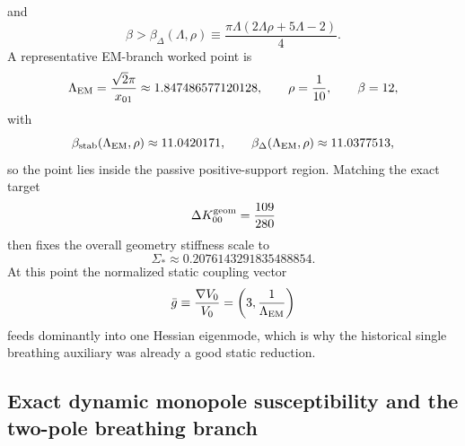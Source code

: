 \documentclass[11pt]{article}
\begin{document}
and
\begin{equation}
\beta>\beta_{\Delta}(\Lambda,\rho)
\equiv
\frac{\pi\Lambda(2\Lambda\rho+5\Lambda-2)}{4}.
\label{eq:geom-breathing-beta-delta}
\end{equation}
A representative EM-branch worked point is
\begin{equation}
\Lambda_{\rm EM}=\frac{\sqrt2\pi}{x_{01}}\approx 1.847486577120128,
\qquad
\rho=\frac{1}{10},
\qquad
\beta=12,
\label{eq:geom-breathing-EM-point}
\end{equation}
with
\begin{equation}
\beta_{\rm stab}(\Lambda_{\rm EM},\rho)\approx 11.0420171,
\qquad
\beta_{\Delta}(\Lambda_{\rm EM},\rho)\approx 11.0377513,
\label{eq:geom-breathing-EM-thresholds}
\end{equation}
so the point lies inside the passive positive-support region.
Matching the exact target
\begin{equation}
\Delta K_{00}^{\rm geom}=\frac{109}{280}
\label{eq:geom-breathing-static-match}
\end{equation}
then fixes the overall geometry stiffness scale to
\begin{equation}
\Sigma_*\approx 0.2076143291835488854.
\label{eq:geom-breathing-Sigma-star}
\end{equation}
At this point the normalized static coupling vector
\begin{equation}
\bar g\equiv \frac{\nabla V_0}{V_0}=
\left(3,\frac{1}{\Lambda_{\rm EM}}\right)
\label{eq:geom-breathing-gbar}
\end{equation}
feeds dominantly into one Hessian eigenmode, which is why the historical single breathing
auxiliary was already a good static reduction.

\subsection{Exact dynamic monopole susceptibility and the two-pole breathing branch}
\label{app:geom-breathing-dynamic}
\end{document}
